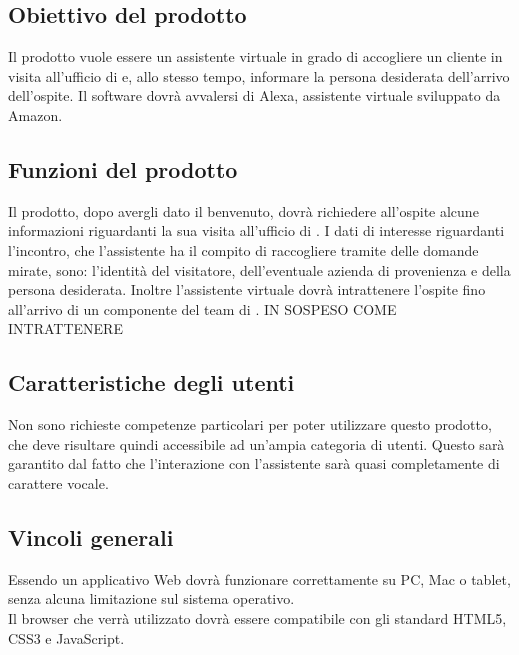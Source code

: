 \subsection{Obiettivo del prodotto}
Il prodotto vuole essere un assistente virtuale in grado di accogliere un cliente in visita all'ufficio di \PROPONENTE{} e, allo stesso tempo, informare la persona desiderata dell'arrivo dell'ospite. Il software dovrà avvalersi di Alexa, assistente virtuale sviluppato da Amazon.
\subsection{Funzioni del prodotto}
Il prodotto, dopo avergli dato il benvenuto, dovrà richiedere all'ospite alcune informazioni riguardanti la sua visita all'ufficio di \PROPONENTE. 
I dati di interesse riguardanti l'incontro, che l'assistente ha il compito di raccogliere tramite delle domande mirate, sono: l'identità del visitatore, dell'eventuale azienda di provenienza e della persona desiderata. Inoltre l'assistente virtuale dovrà intrattenere l'ospite fino all'arrivo di un componente del team di \PROPONENTE{}. IN SOSPESO COME INTRATTENERE 
\subsection{Caratteristiche degli utenti}
Non sono richieste competenze particolari per poter utilizzare questo prodotto, che deve risultare
quindi accessibile ad un'ampia categoria di utenti. Questo sarà garantito dal fatto che l'interazione con l'assistente sarà quasi completamente di carattere vocale.
\subsection{Vincoli generali}
Essendo un applicativo Web dovrà funzionare correttamente su PC, Mac o tablet, senza alcuna limitazione sul sistema operativo.\\
Il browser che verrà utilizzato dovrà essere compatibile con gli standard HTML5, CSS3 e JavaScript.